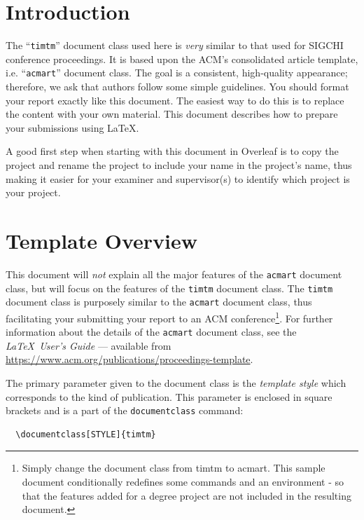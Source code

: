 \documentclass[manuscript, screen]{timtm}
\begin{document}
\setcounter{page}{1}

\maketitle

\section{Introduction}
The ``\verb|timtm|'' document class used here is \emph{very} similar to that used for SIGCHI
conference proceedings. It is based upon the ACM's consolidated article template, i.e. ``\verb|acmart|'' document class.
The goal is a consistent, high-quality appearance; therefore, we ask that authors follow some
simple guidelines. You should format your report exactly like this
document. The easiest way to do this is to replace the content with
your own material.  This document describes how to prepare your
submissions using \LaTeX\@.

A good first step when starting with this document in Overleaf is to copy the project and rename the project to include your name in the project's name, thus making it easier for your examiner and supervisor(s) to identify which project is your project.

\section{Template Overview}

This document will \emph{not} explain all the major features of the \verb|acmart| document
class, but will focus on the features of the \verb|timtm| document
class. The \verb|timtm| document
class is purposely similar to the \verb|acmart| document
class, thus facilitating your submitting your report to an ACM conference\footnote{Simply change the document class from timtm to acmart. This sample document conditionally redefines some commands and an environment - so that the features added for a degree project are not included in the resulting document.}. For further information about the details of the \verb|acmart| document
class, see the {\itshape \LaTeX\ User's Guide} --- 
available from \url{https://www.acm.org/publications/proceedings-template}.

The primary parameter given to the document class is
the {\itshape template style} which corresponds to the kind of publication. This parameter is enclosed in square
brackets and is a part of the {\verb|documentclass|} command:
\begin{verbatim}
  \documentclass[STYLE]{timtm}
\end{verbatim}
\end{document}
